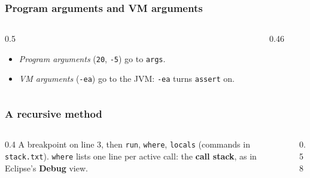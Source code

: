 \documentclass[aspectratio=169,10pt,compress]{beamer}
\begin{document}




\begin{frame}[t,fragile] \frametitle{Program arguments and VM arguments}
  \begin{columns}[T]
    \begin{column}{0.5\textwidth}
      \begin{itemize}\small
        \item \emph{Program arguments} (\texttt{20}, \texttt{-5}) go to \texttt{args}.
        \item \emph{VM arguments} (\texttt{-ea}) go to the JVM: \texttt{-ea} turns \texttt{assert} on.
      \end{itemize}
    \end{column}
    \begin{column}{0.46\textwidth}
    \end{column}
  \end{columns}
\end{frame}





\begin{frame}[t,fragile] \frametitle{A recursive method}
  \begin{columns}[T]
    \begin{column}{0.4\textwidth}
      \small A breakpoint on line 3, then \texttt{run}, \texttt{where}, \texttt{locals} (commands in \texttt{stack.txt}).
      \texttt{where} lists one line per active call: the \textbf{call stack}, as in Eclipse's \textbf{Debug} view.
    \end{column}
    \begin{column}{0.58\textwidth}
    \end{column}
  \end{columns}
\end{frame}
\end{document}
